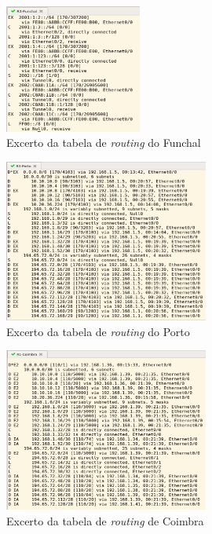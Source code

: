 \documentclass[11pt]{article}
\begin{document}
	\begin{figure}[h]
		\centering
		\includegraphics[width=0.4\textwidth]{routing-funchal}
		\caption{Excerto da tabela de \emph{routing} do Funchal}
		\label{fig.nav}
	\end{figure}

	\begin{figure}[h]
		\centering
		\includegraphics[width=0.6\textwidth]{routing-porto}
		\caption{Excerto da tabela de \emph{routing} do Porto}
		\label{fig.nav}
	\end{figure}

	\begin{figure}[h]
		\centering
		\includegraphics[width=0.6\textwidth]{routing-coimbra}
		\caption{Excerto da tabela de \emph{routing} de Coimbra}
		\label{fig.nav}
	\end{figure}
\end{document}
